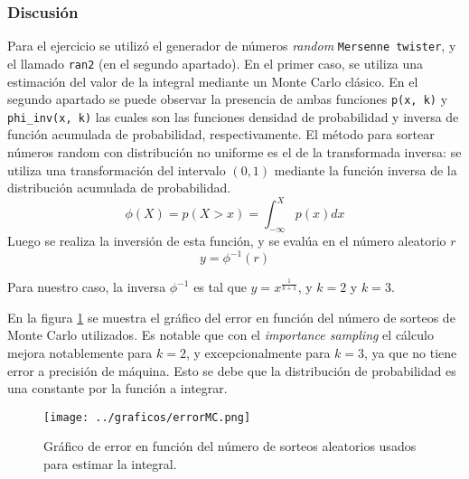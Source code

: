 \documentclass[a4paper,10pt]{paper}
\begin{document}
\subsubsection{Discusi\'on}
Para el ejercicio se utiliz\'o el generador de n\'umeros \textit{random} \texttt{Mersenne twister}, 
y el llamado \texttt{ran2} (en el segundo apartado).
En el primer caso, se utiliza una estimaci\'on del valor de la integral mediante un Monte Carlo 
cl\'asico. En el segundo apartado se puede observar la presencia de ambas funciones \texttt{p(x, k)} y 
\texttt{phi\_inv(x, k)} las cuales son las funciones densidad de probabilidad y inversa de funci\'on 
acumulada de probabilidad, respectivamente.
El m\'etodo para sortear n\'umeros random con distribuci\'on no uniforme es el de la transformada inversa:
se utiliza una transformaci\'on del intervalo $(0,1)$ mediante la funci\'on inversa de la distribuci\'on 
acumulada de probabilidad.
\begin{displaymath}
 \phi(X) = p(X>x) = \int_{-\infty}^{X}p(x)dx
\end{displaymath}
Luego se realiza la inversi\'on de esta funci\'on, y se eval\'ua en el n\'umero aleatorio $r$
\begin{displaymath}
 y = \phi^{-1}(r)
\end{displaymath}

Para nuestro caso, la inversa $\phi^{-1}$ es tal que $y = x^{\frac{1}{k+1}}$, y $k=2$ y $k=3$.

En la figura \ref{fig:ej3ab} se muestra el gr\'afico del error en funci\'on del n\'umero de sorteos
de Monte Carlo utilizados.
Es notable que con el \textit{importance sampling} el c\'alculo mejora notablemente para $k=2$, y 
excepcionalmente para $k=3$, ya que no tiene error a precisi\'on de m\'aquina.
Esto se debe que la distribuci\'on de probabilidad es una constante por la funci\'on a integrar.

\begin{figure}
 \centering
 \texttt{[image: ../graficos/errorMC.png]}
 \caption{Gr\'afico de error en funci\'on del n\'umero de sorteos aleatorios usados para estimar la 
 integral.}
 \label{fig:ej3ab}
\end{figure}
\end{document}
